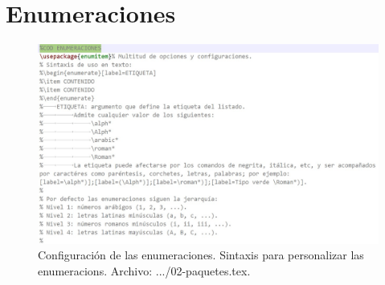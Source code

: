 \chapter{Enumeraciones}
%
\begin{figure}[H]
	\centering
	\includegraphics[width=1\linewidth, frame]{cuerpo/cap-objetos/imagenes/enumeraciones}
	\caption[Configuración de las enumeraciones.]{Configuración de las enumeraciones. Sintaxis para personalizar las enumeracions. Archivo: .../02-paquetes.tex.}
	\label{fig:enumeraciones}
\end{figure}
%
%

